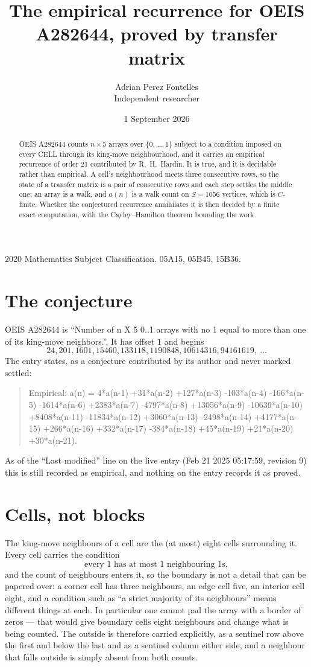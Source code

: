 \documentclass[11pt,a4paper]{article}
\title{The empirical recurrence for OEIS A282644, proved by transfer matrix}
\author{Adrian Perez Fontelles\\ \small Independent researcher}
\date{1 September 2026}
\theoremstyle{plain}
\theoremstyle{definition}
\begin{document}
\maketitle

\begin{abstract}
OEIS A282644 counts $n\times5$ arrays over $\{0,\dots,1\}$ subject to a condition imposed on
every CELL through its king-move neighbourhood, and it carries an empirical recurrence of
order $21$ contributed by R.~H.~Hardin. It is true, and it is decidable rather than
empirical. A cell's neighbourhood meets three consecutive rows, so the state of a transfer
matrix is a pair of consecutive rows and each step settles the middle one; an array is a
walk, and $a(n)$ is a walk count on $S=1056$ vertices, which is $C$-finite. Whether the
conjectured recurrence annihilates it is then decided by a finite exact computation, with the
Cayley--Hamilton theorem bounding the work.
\end{abstract}

\noindent\small 2020 Mathematics Subject Classification. 05A15, 05B45, 15B36.\normalsize

\section{The conjecture}

OEIS A282644 is ``Number of n X 5 0..1 arrays with no 1 equal to more than one of its king-move neighbors.''. It has offset $1$ and begins
\[
24, 201, 1601, 15460, 133118, 1190848, 10614316, 94161619,\ \dots
\]
The entry states, as a conjecture contributed by its author and never marked settled:
\begin{quote}
Empirical: a(n) = 4*a(n-1) +31*a(n-2) +127*a(n-3) -103*a(n-4) -166*a(n-5) -1614*a(n-6) +2383*a(n-7) -4797*a(n-8) +13056*a(n-9) -10639*a(n-10) +8408*a(n-11) -11834*a(n-12) +3060*a(n-13) -2498*a(n-14) +4177*a(n-15) +266*a(n-16) +332*a(n-17) -384*a(n-18) +45*a(n-19) +21*a(n-20) +30*a(n-21).
\end{quote}
As of the ``Last modified'' line on the live entry (Feb 21 2025 05:17:59, revision 9) this is still
recorded as empirical, and nothing on the entry records it as proved.

\section{Cells, not blocks}

The king-move neighbours of a cell are the (at most) eight cells surrounding it. Every cell
carries the condition
\[
\text{every }1\text{ has at most }1\text{ neighbouring }1\text{s},
\]
and the count of neighbours enters it, so the boundary is not a detail that can be papered
over: a corner cell has three neighbours, an edge cell five, an interior cell eight, and a
condition such as ``a strict majority of its neighbours'' means different things at each. In
particular one cannot pad the array with a border of zeros --- that would give boundary cells
eight neighbours and change what is being counted. The outside is therefore carried
explicitly, as a sentinel row above the first and below the last and as a sentinel column
either side, and a neighbour that falls outside is simply absent from both counts.
\end{document}
